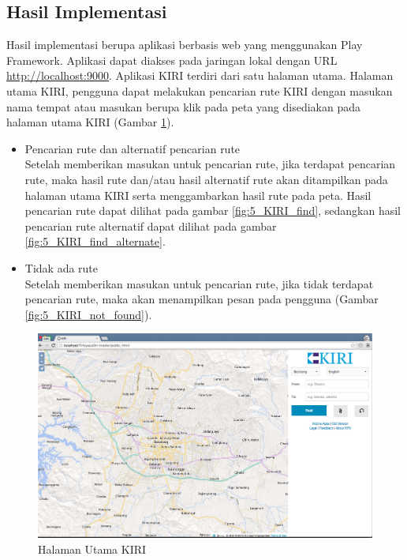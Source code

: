 \subsection{Hasil Implementasi}
Hasil implementasi berupa aplikasi berbasis web yang menggunakan Play Framework. Aplikasi dapat diakses pada jaringan lokal dengan URL \url{http://localhost:9000}. Aplikasi KIRI terdiri dari satu halaman utama. Halaman utama KIRI, pengguna dapat melakukan pencarian rute KIRI dengan masukan nama tempat atau masukan berupa klik pada peta yang disediakan pada halaman utama KIRI (Gambar \ref{fig:5_KIRI_main}).
\begin{itemize}
	\item Pencarian rute dan alternatif pencarian rute\\
	Setelah memberikan masukan untuk pencarian rute, jika terdapat pencarian rute, maka hasil rute dan/atau hasil alternatif rute akan ditampilkan pada halaman utama KIRI serta menggambarkan hasil rute pada peta. Hasil pencarian rute dapat dilihat pada gambar \ref{fig:5_KIRI_find}, sedangkan hasil pencarian rute alternatif dapat dilihat pada gambar \ref{fig:5_KIRI_find_alternate}.
	\item Tidak ada rute\\
	Setelah memberikan masukan untuk pencarian rute, jika tidak terdapat pencarian rute, maka akan menampilkan pesan pada pengguna (Gambar \ref{fig:5_KIRI_not_found}).
\end{itemize}

\begin{figure}[H]
	\centering
	\includegraphics[scale=0.3]{Gambar/KIRI-main-5}
	\caption{Halaman Utama KIRI} 
	\label{fig:5_KIRI_main}
\end{figure}


